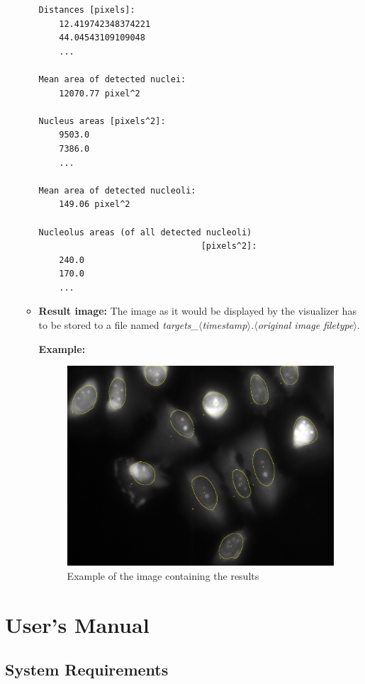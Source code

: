 \documentclass[a4paper, 11pt]{article}
\begin{document}
\begin{itemize}
\begin{itemize}
\begin{lstlisting}[frame=single, caption=Example of statistics file]
Distances [pixels]: 
	12.419742348374221
	44.04543109109048
	...

Mean area of detected nuclei: 
	12070.77 pixel^2

Nucleus areas [pixels^2]: 
	9503.0
	7386.0
	...

Mean area of detected nucleoli: 
	149.06 pixel^2

Nucleolus areas (of all detected nucleoli)
								[pixels^2]: 
	240.0
	170.0
	...
\end{lstlisting}
  	\item \textbf{Result image:} The image as it would be displayed by the
  	visualizer has to be stored to a file named
  	\textit{targets\_$\langle$timestamp$\rangle$.$\langle$original
  	image filetype$\rangle$}.

  	\textbf{Example:}
  	\begin{figure}[h]
    \includegraphics[width=\linewidth]{images/targets_example}
    \caption{Example of the image containing the results}
    \label{fig:target_image_example}
\end{figure}
  \end{itemize}
\end{itemize}
\newpage
\section{User's Manual}

\subsection{System Requirements}
\end{document}
